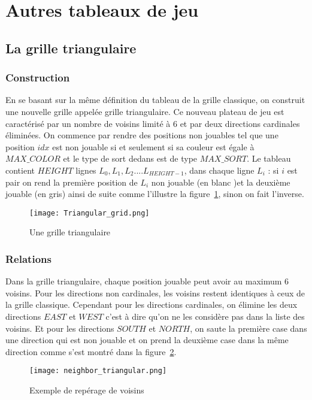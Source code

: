 \documentclass[11pt]{article}
\begin{document}
    \section{Autres tableaux de jeu}
        \subsection{La grille triangulaire}
            \subsubsection{Construction}
                    En se basant sur la même définition du tableau de la grille classique, on construit une nouvelle grille appelée grille triangulaire. Ce nouveau plateau de jeu est caractérisé par un nombre de voisins limité à 6 et par deux directions cardinales éliminées. On commence par rendre des positions non jouables tel que une position $idx$ est non jouable si et seulement si sa couleur est égale à $MAX\_COLOR$ et le type de sort dedans est de type $MAX\_SORT$. Le tableau contient $HEIGHT$ lignes  $L_{0}, L_{1}, L_{2}....L_{HEIGHT - 1}$, dans chaque ligne $L_{i}$ : si $i$ est pair on rend la première position de $L_{i}$ non jouable (en blanc )et la deuxième jouable (en gris) ainsi de suite comme l'illustre la figure~\ref{figure23}, sinon on fait l'inverse.
                    \begin{figure}[h]
                            \centering
                            \texttt{[image: Triangular\_grid.png]}
                            \caption{ Une grille triangulaire }
                            \label{figure23}
                            \end{figure}
            \subsubsection{Relations}
                Dans la grille triangulaire, chaque position jouable peut avoir au maximum 6 voisins. Pour les directions non cardinales, les voisins restent identiques à ceux de la grille classique. Cependant pour les directions cardinales, on élimine les deux directions $EAST$ et $WEST$ c'est à dire qu'on ne les considère pas dans la liste des voisins. Et pour les directions $SOUTH$ et $NORTH$, on saute la première case dans une direction qui est non jouable et on prend la deuxième case dans la même direction comme s'est montré dans la figure~\ref{figure24}. 
                \begin{figure}[h]
                                \centering
                                \texttt{[image: neighbor\_triangular.png]}
                                \caption{ Exemple de repérage de voisins }
                                \label{figure24}
                                \end{figure} 
\end{document}
